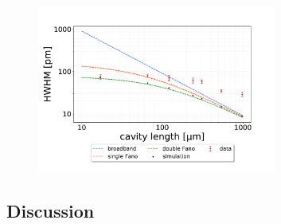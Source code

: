 \begin{figure}[h!]
    \centering
    \includegraphics[width=0.7\textwidth]{figures/results/double fano fits/HWHM_vs_cavity_length_result.pdf}
    \caption{}
    \label{fig:HWHM_vs_l_double_fano_result}
\end{figure}

\subsection{Discussion}

